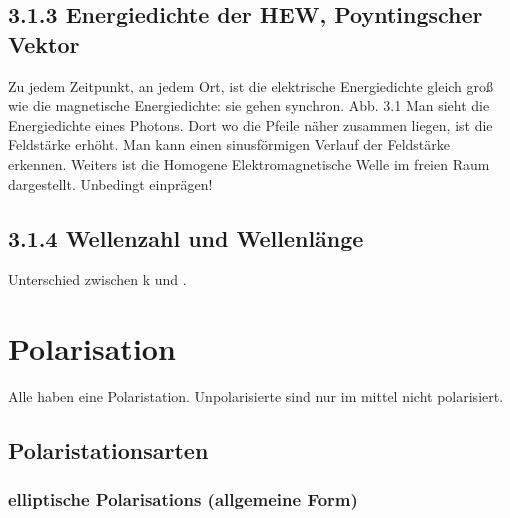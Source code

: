 \documentclass[a4paper]{article}
\begin{document}
\subsection*{3.1.3 Energiedichte der HEW, Poyntingscher Vektor}
Zu jedem Zeitpunkt, an jedem Ort, ist die elektrische Energiedichte gleich groß wie die magnetische Energiedichte: sie gehen synchron.\newline
Abb. 3.1 Man sieht die Energiedichte eines Photons. Dort wo die Pfeile näher zusammen liegen, ist die Feldstärke erhöht. Man kann einen sinusförmigen Verlauf der Feldstärke erkennen.\newline
Weiters ist die Homogene Elektromagnetische Welle im freien Raum dargestellt. Unbedingt einprägen!\newline
\subsection*{3.1.4 Wellenzahl und Wellenlänge}
Unterschied zwischen k und \omega.
\section*{Polarisation}
Alle haben eine Polaristation. Unpolarisierte sind nur im mittel nicht polarisiert.
\subsection*{Polaristationsarten}
\subsubsection*{elliptische Polarisations (allgemeine Form)}
\end{document}
